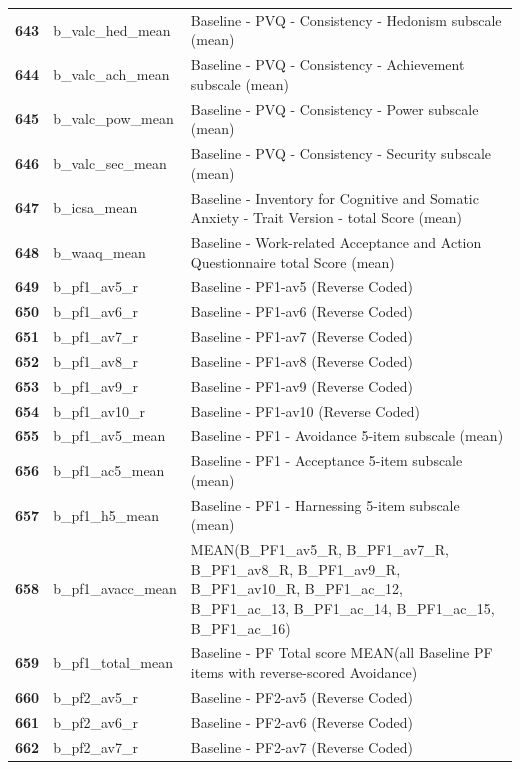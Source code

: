 \documentclass[
  letterpaper,
  DIV=11,
  numbers=noendperiod]{scrartcl}
\begin{document}
\begin{longtable}[t]{>{}cll}
\textbf{643} & b\_valc\_hed\_mean & Baseline - PVQ - Consistency - Hedonism subscale (mean)\\
\textbf{644} & b\_valc\_ach\_mean & Baseline - PVQ - Consistency - Achievement subscale (mean)\\
\textbf{645} & b\_valc\_pow\_mean & Baseline - PVQ - Consistency - Power subscale (mean)\\
\addlinespace
\textbf{646} & b\_valc\_sec\_mean & Baseline - PVQ - Consistency - Security subscale (mean)\\
\textbf{647} & b\_icsa\_mean & Baseline - Inventory for Cognitive and Somatic Anxiety - Trait Version - total Score (mean)\\
\textbf{648} & b\_waaq\_mean & Baseline - Work-related Acceptance and Action Questionnaire total Score (mean)\\
\textbf{649} & b\_pf1\_av5\_r & Baseline - PF1-av5 (Reverse Coded)\\
\textbf{650} & b\_pf1\_av6\_r & Baseline - PF1-av6 (Reverse Coded)\\
\addlinespace
\textbf{651} & b\_pf1\_av7\_r & Baseline - PF1-av7 (Reverse Coded)\\
\textbf{652} & b\_pf1\_av8\_r & Baseline - PF1-av8 (Reverse Coded)\\
\textbf{653} & b\_pf1\_av9\_r & Baseline - PF1-av9 (Reverse Coded)\\
\textbf{654} & b\_pf1\_av10\_r & Baseline - PF1-av10 (Reverse Coded)\\
\textbf{655} & b\_pf1\_av5\_mean & Baseline - PF1 - Avoidance 5-item subscale (mean)\\
\addlinespace
\textbf{656} & b\_pf1\_ac5\_mean & Baseline - PF1 - Acceptance 5-item subscale (mean)\\
\textbf{657} & b\_pf1\_h5\_mean & Baseline - PF1 - Harnessing 5-item subscale (mean)\\
\textbf{658} & b\_pf1\_avacc\_mean & MEAN(B\_PF1\_av5\_R, B\_PF1\_av7\_R, B\_PF1\_av8\_R, B\_PF1\_av9\_R, B\_PF1\_av10\_R, B\_PF1\_ac\_12, B\_PF1\_ac\_13, B\_PF1\_ac\_14, B\_PF1\_ac\_15, B\_PF1\_ac\_16)\\
\textbf{659} & b\_pf1\_total\_mean & Baseline - PF Total score MEAN(all Baseline PF items with reverse-scored Avoidance)\\
\textbf{660} & b\_pf2\_av5\_r & Baseline - PF2-av5 (Reverse Coded)\\
\addlinespace
\textbf{661} & b\_pf2\_av6\_r & Baseline - PF2-av6 (Reverse Coded)\\
\textbf{662} & b\_pf2\_av7\_r & Baseline - PF2-av7 (Reverse Coded)\\

\end{longtable}
\end{document}

